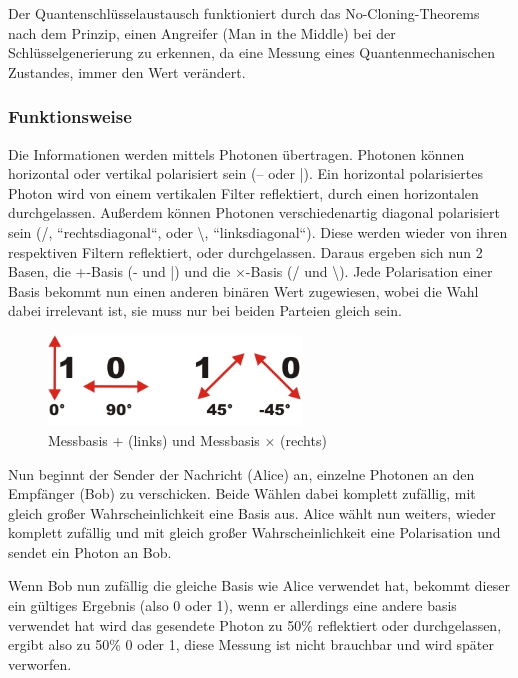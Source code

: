 Der Quantenschlüsselaustausch funktioniert durch das No-Cloning-Theorems nach dem Prinzip, einen Angreifer (Man in the Middle) bei der Schlüsselgenerierung zu erkennen, da eine Messung eines Quantenmechanischen Zustandes, immer den Wert verändert.

\subsubsection{Funktionsweise}

Die Informationen werden mittels Photonen übertragen. Photonen können horizontal oder vertikal polarisiert sein (– oder |). Ein horizontal polarisiertes Photon wird von einem vertikalen Filter reflektiert, durch einen horizontalen durchgelassen.
Außerdem können Photonen verschiedenartig diagonal polarisiert sein (/, “rechtsdiagonal“, oder \textbackslash, “linksdiagonal“). Diese werden wieder von ihren respektiven Filtern reflektiert, oder durchgelassen.
Daraus ergeben sich nun 2 Basen, die +-Basis (- und |) und die $\times$-Basis (/ und \textbackslash).
Jede Polarisation einer Basis bekommt nun einen anderen binären Wert zugewiesen, wobei die Wahl dabei irrelevant ist, sie muss nur bei beiden Parteien gleich sein. 

\begin{figure}[!htb]
	\centering\includegraphics[width=0.6\textwidth]{images/polarisation}
	\caption{Messbasis + (links) und Messbasis $\times$ (rechts) \cite{quantenschluesselaustausch}}
	\label{fig:polarisation}
\end{figure}

Nun beginnt der Sender der Nachricht (Alice) an, einzelne Photonen an den Empfänger (Bob) zu verschicken. Beide Wählen dabei komplett zufällig, mit gleich großer Wahrscheinlichkeit eine Basis aus. 
Alice wählt nun weiters, wieder komplett zufällig und mit gleich großer Wahrscheinlichkeit eine Polarisation und sendet ein Photon an Bob.

Wenn Bob nun zufällig die gleiche Basis wie Alice verwendet hat, bekommt dieser ein gültiges Ergebnis (also 0 oder 1), wenn er allerdings eine andere basis verwendet hat wird das gesendete Photon zu 50\% reflektiert oder durchgelassen, ergibt also zu 50\% 0 oder 1, diese Messung ist nicht brauchbar und wird später verworfen.

